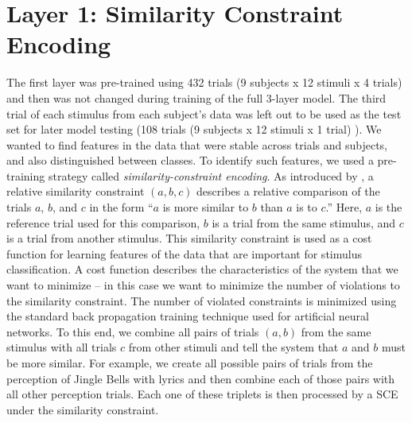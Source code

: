 \section{Layer 1: Similarity Constraint Encoding}
The first layer was pre-trained using 432 trials (9 subjects x 12 stimuli x 4 trials) and then was not changed during training of the full 3-layer model. 
The third trial of each stimulus from each subject's data was left out to be used as the test set for later model testing (108 trials (9 subjects x 12 stimuli x 1 trial) ).
We wanted to find features in the data that were stable across trials and subjects, and also distinguished between classes. 
To identify such features, we used a pre-training strategy called \emph{similarity-constraint encoding}.
As introduced by \cite{schultz_learning_2004}, a relative similarity constraint $(a,b,c)$ describes a relative comparison of the trials $a$, $b$, and $c$ in the form ``$a$ is more similar to $b$ than $a$ is to $c$.''
Here, $a$ is the reference trial used for this comparison, $b$ is a trial from the same stimulus, and $c$ is a trial from another stimulus.
This similarity constraint is used as a cost function for learning features of the data that are important for stimulus classification. 
A cost function describes the characteristics of the system that we want to minimize -- in this case we want to minimize the number of violations to the similarity constraint.
The number of violated constraints is minimized using the standard back propagation training technique used for artificial neural networks.
To this end, we combine all pairs of trials $(a,b)$ from the same stimulus with all trials $c$ from other stimuli and tell the system that $a$ and $b$ must be more similar.
For example, we create all possible pairs of trials from the perception of Jingle Bells with lyrics and then combine each of those pairs with all other perception trials.
Each one of these triplets is then processed by a \ac{SCE} under the similarity constraint.
